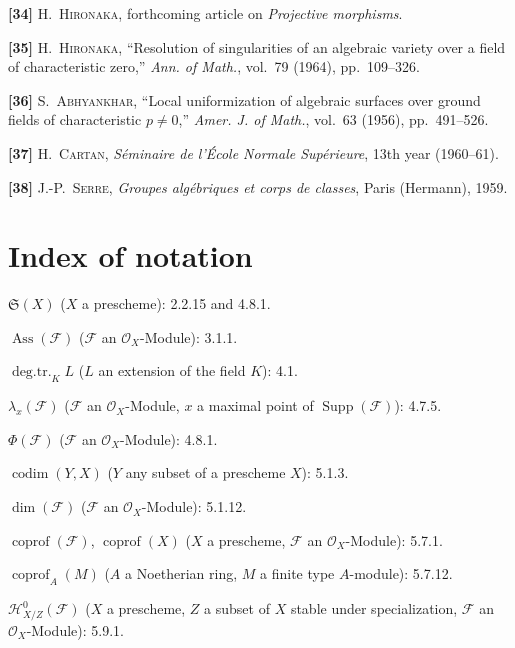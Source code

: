 \textbf{[34]} H.~\textsc{Hironaka}, forthcoming article on \emph{Projective
morphisms}.

\textbf{[35]} H.~\textsc{Hironaka}, ``Resolution of singularities of an
algebraic variety over a field of characteristic zero,'' \emph{Ann. of Math.},
vol.~79 (1964), pp.~109--326.

\textbf{[36]} S.~\textsc{Abhyankhar}, ``Local uniformization of algebraic
surfaces over ground fields of characteristic $p\ne0$,'' \emph{Amer. J. of
Math.}, vol.~63 (1956), pp.~491--526.

\textbf{[37]} H.~\textsc{Cartan}, \emph{Séminaire de l'École Normale
Supérieure}, 13th year (1960--61).

\textbf{[38]} J.-P.~\textsc{Serre}, \emph{Groupes algébriques et corps de
classes}, Paris (Hermann), 1959.

\endgroup

\clearpage
{}
{}
\section*{Index of notation}

\begingroup
\small
\setlength{\parindent}{0pt}
\setlength{\parskip}{2pt}

$\mathfrak S(X)$ ($X$ a prescheme): 2.2.15 and 4.8.1.

$\operatorname{Ass}(\mathscr F)$ ($\mathscr F$ an $\mathcal O_X$-Module): 3.1.1.

$\operatorname{deg.tr.}_K L$ ($L$ an extension of the field $K$): 4.1.

$\lambda_x(\mathscr F)$ ($\mathscr F$ an $\mathcal O_X$-Module, $x$ a maximal
point of $\operatorname{Supp}(\mathscr F)$): 4.7.5.

$\Phi(\mathscr F)$ ($\mathscr F$ an $\mathcal O_X$-Module): 4.8.1.

$\operatorname{codim}(Y,X)$ ($Y$ any subset of a prescheme $X$): 5.1.3.

$\dim(\mathscr F)$ ($\mathscr F$ an $\mathcal O_X$-Module): 5.1.12.

$\operatorname{coprof}(\mathscr F)$, $\operatorname{coprof}(X)$ ($X$ a
prescheme, $\mathscr F$ an $\mathcal O_X$-Module): 5.7.1.

$\operatorname{coprof}_A(M)$ ($A$ a Noetherian ring, $M$ a finite type
$A$-module): 5.7.12.

$\mathcal H^0_{X/Z}(\mathscr F)$ ($X$ a prescheme, $Z$ a subset of $X$ stable
under specialization, $\mathscr F$ an $\mathcal O_X$-Module): 5.9.1.

